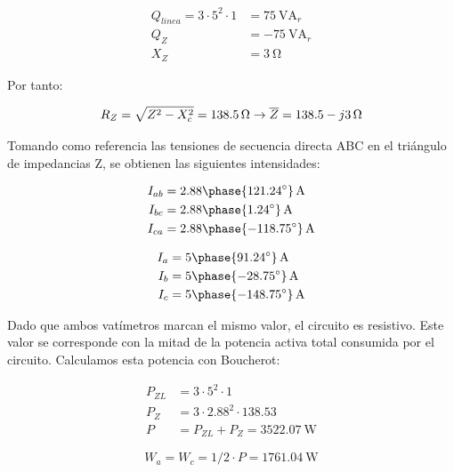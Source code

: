 \documentclass[12pt]{article}
\begin{document}
\begin{align*}
  Q_{linea} = 3 \cdot 5^2 \cdot 1 &= \SI{75}{\volt\ampere}_r\\
  Q_Z &= -\SI{75}{\volt\ampere}_r\\
  X_Z &= \SI{3}{\ohm}
\end{align*}

Por tanto:

\[
  R_Z = \sqrt{Z^2 - X_c^2} = \SI{138.5}{\ohm} \rightarrow \overline{Z} = \SI[parse-numbers=false]{138.5 - j3}{\ohm}
\]

Tomando como referencia las tensiones de secuencia directa ABC
en el triángulo de impedancias Z, se obtienen las siguientes
intensidades:

\begin{align*}
  I_{ab} &= \SI[parse-numbers=false]{2.88\phase{121.24^\circ}}{\ampere}\\
  I_{bc} &= \SI[parse-numbers=false]{2.88\phase{1.24^\circ}}{\ampere}\\
  I_{ca} &= \SI[parse-numbers=false]{2.88\phase{-118.75^\circ}}{\ampere}\\
\end{align*}

\begin{align*}
  I_{a} &= \SI[parse-numbers=false]{5\phase{91.24^\circ}}{\ampere}\\
  I_{b} &= \SI[parse-numbers=false]{5\phase{-28.75^\circ}}{\ampere}\\
  I_{c} &= \SI[parse-numbers=false]{5\phase{-148.75^\circ}}{\ampere}\\
\end{align*}



Dado que ambos vatímetros marcan el mismo valor, el circuito es
resistivo. Este valor se corresponde con la mitad de la potencia
activa total consumida por el circuito. Calculamos esta potencia con Boucherot:


\begin{align*}
  P_{ZL} &= 3 \cdot 5^2 \cdot 1\\
  P_Z &= 3 \cdot 2.88^2 \cdot 138.53\\
  P &= P_{ZL} + P_{Z} = \SI{3522.07}{\watt}
\end{align*}

\[
  W_a = W_c = 1/2 \cdot P = \SI{1761.04}{\watt}
\]

\clearpage

\section{}
\end{document}
